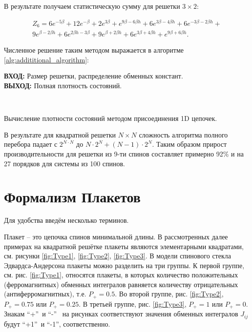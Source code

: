 \documentclass[utf8, babel, sor, jor, amsmath, amssymb, reprint]{elsarticle} %
\begin{document}
В результате получаем статистическую сумму для решетки $3 \times 2$:

\begin{equation}
	\label{eq:stat_3_res}
	\begin{alignedat}{2}
		Z_6 = 6 e^{-5 \beta }+12 e^{-\beta }+2 e^{3 \beta }+e^{9 \beta -6 \beta  h}+6 e^{3 \beta -4 \beta  h}+6 e^{-3 \beta -2 \beta  h}+\\
		9 e^{\beta -2 \beta  h}+6 e^{2 \beta  h-3 \beta }+9 e^{\beta +2 \beta  h}+6 e^{3 \beta +4 \beta  h}+e^{9 \beta +6 \beta  h}.
	\end{alignedat}
\end{equation}

Численное решение таким методом выражается в алгоритме \ref{alg:addititional_algorithm}:


\begin{algorithm}[H]
	\textbf{ВХОД:} Размер решетки, распределение обменных констант.\\
	\textbf{ВЫХОД:} Полная плотность состояний.
	\begin{algorithmic}
		{
			{
			}
			\ENDFOR\\
		}
		\ENDFOR
	\end{algorithmic}
	\caption{Вычисление плотности состояний методом присоединения 1D цепочек.}
	\label{alg:addititional_algorithm}
\end{algorithm}
				
В результате для квадратной решетки $N \times N$ сложность алгоритма полного перебора падает с $2^{N \cdot N}$ до $N \cdot 2^N + (N - 1) \cdot 2^N$. Таким образом прирост производительности для решетки из 9-ти спинов составляет примерно 92\% и на 27 порядков для системы из 100 спинов.


\section{Формализм Плакетов}

Для удобства введём несколько терминов.


 Плакет – это цепочка спинов минимальной длины. В рассмотренных далее примерах на квадратной решётке плакеты являются элементарными квадратами, см. рисунки \ref{fig:Type1}, \ref{fig:Type2}, \ref{fig:Type3}. В модели спинового стекла Эдвардса-Андерсона плакеты можно разделить на три группы. К первой группе, см. рис. \ref{fig:Type1}, относятся плакеты, в которых количество положительных (ферромагнитных) обменных интегралов равняется количеству отрицательных (антиферромагнитных), т.е. $P_+=0.5$. Во второй группе, рис. \ref{fig:Type2}, $P_+=0.75$ или $P_+=0.25$. В третьей группе, рис. \ref{fig:Type3}, $P_+=1$ или $P_+=0$. Знакам \textquotedblleft +\textquotedblright ~и   \textquotedblleft -\textquotedblright ~ на рисунках соответствуют значения обменных интегралов $J_{ij}$ будут \textquotedblleft +1\textquotedblright ~и \textquotedblleft -1\textquotedblright, соответственно.
 
\end{document}
